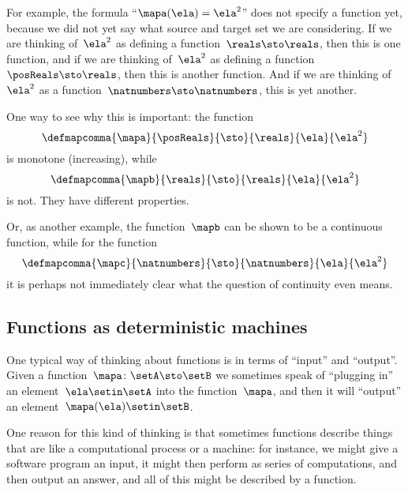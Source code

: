For example, the formula ``$\mapa(\ela)=\ela^2$'' does not specify a function yet, because we did not yet say what source and target set we are considering.
If we are thinking of~$\ela^2$ as defining a function~$\reals \sto \reals$, then this is one function, and if we are thinking of~$\ela^2$ as defining a function~$\posReals \sto \reals$, then this is another function.
And if we are thinking of~$\ela^2$ as a function~$\natnumbers \sto \natnumbers$, this is yet another.

One way to see why this is important: the function
\begin{equation}
    \defmapcomma{
        \mapa
    }{
        \posReals
    }{
        \sto
    }{
        \reals
    }{
        \ela
    }{
        \ela^2
    }
\end{equation}
is monotone (increasing), while
\begin{equation}
    \defmapcomma{
        \mapb
    }{
        \reals
    }{
        \sto
    }{
        \reals
    }{
        \ela
    }{
        \ela^2
    }
\end{equation}
is not.
They have different properties.

Or, as another example, the function~$\mapb$ can be shown to be a continuous function, while for the function
\begin{equation}
    \defmapcomma{
        \mapc
    }{
        \natnumbers
    }{
        \sto
    }{
        \natnumbers
    }{
        \ela
    }{
        \ela^2
    }
\end{equation}
it is perhaps not immediately clear what the question of continuity even means.

\subsection{Functions as deterministic machines}

One typical way of thinking about functions is in terms of ``input'' and ``output''.
Given a function~$\mapa\colon \setA \sto \setB$ we sometimes speak of ``plugging in'' an element~$\ela \setin\setA$ into the function~$\mapa$, and then it will ``output'' an element~$\mapa(\ela) \setin\setB$.

One reason for this kind of thinking is that sometimes functions describe things that are like a computational process or a machine:
for instance, we might give a software program an input, it might then perform as series of computations, and then output an answer, and all of this might be described by a function.

